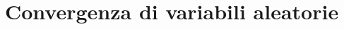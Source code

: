 
\chapter{Convergenza di variabili aleatorie}

\ParteEsercizi

\Esercizio{}

\ParteSoluzioni

\Soluzione{}